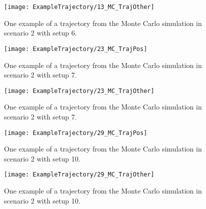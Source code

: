 \begin{figure}[!ht]
	\centering
	\texttt{[image: ExampleTrajectory/13\_MC\_TrajOther]}
	\caption{\label{fig:13trajectorycrossingroiother} One example of a trajectory from the Monte Carlo simulation in scenario 2 with setup 6.}
\end{figure}

\begin{figure}[!ht]
	\centering
	\texttt{[image: ExampleTrajectory/23\_MC\_TrajPos]}
	\caption{\label{fig:23trajectorycrossingroiangvelpos} One example of a trajectory from the Monte Carlo simulation in scenario 2 with setup 7.}
\end{figure}

\begin{figure}[!ht]
	\centering
	\texttt{[image: ExampleTrajectory/23\_MC\_TrajOther]}
	\caption{\label{fig:23trajectorycrossingroiangvelother} One example of a trajectory from the Monte Carlo simulation in scenario 2 with setup 7.}
\end{figure}

\begin{figure}[!ht]
	\centering
	\texttt{[image: ExampleTrajectory/29\_MC\_TrajPos]}
	\caption{\label{fig:29trajectorycrossingroiangvelcornerpos} One example of a trajectory from the Monte Carlo simulation in scenario 2 with setup 10.}
\end{figure}

\begin{figure}[!ht]
	\centering
	\texttt{[image: ExampleTrajectory/29\_MC\_TrajOther]}
	\caption{\label{fig:29trajectorycrossingroiangvelcornerother} One example of a trajectory from the Monte Carlo simulation in scenario 2 with setup 10.}
\end{figure}